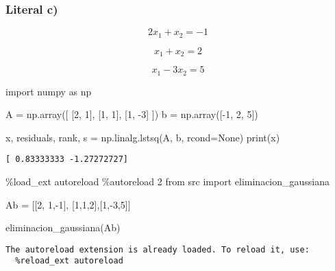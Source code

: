 \documentclass[
  letterpaper,
  DIV=11,
  numbers=noendperiod]{scrartcl}
\newenvironment{Shaded}{\begin{snugshade}}{\end{snugshade}}
\newcommand{\BuiltInTok}[1]{\textcolor[rgb]{0.00,0.23,0.31}{#1}}
\newcommand{\DecValTok}[1]{\textcolor[rgb]{0.68,0.00,0.00}{#1}}
\newcommand{\ImportTok}[1]{\textcolor[rgb]{0.00,0.46,0.62}{#1}}
\newcommand{\NormalTok}[1]{\textcolor[rgb]{0.00,0.23,0.31}{#1}}
\newcommand{\OperatorTok}[1]{\textcolor[rgb]{0.37,0.37,0.37}{#1}}
\newcommand{\VariableTok}[1]{\textcolor[rgb]{0.07,0.07,0.07}{#1}}
\begin{document}
\subsubsection{Literal c)}\label{literal-c}

\[2x_1 + x_2 = -1\]

\[x_1 + x_2 = 2\]

\[x_1 - 3x_2 = 5\]

\begin{Shaded}
\begin{Highlighting}[]

\ImportTok{import}\NormalTok{ numpy }\ImportTok{as}\NormalTok{ np}

\NormalTok{A }\OperatorTok{=}\NormalTok{ np.array([}
\NormalTok{    [}\DecValTok{2}\NormalTok{, }\DecValTok{1}\NormalTok{],}
\NormalTok{    [}\DecValTok{1}\NormalTok{, }\DecValTok{1}\NormalTok{],}
\NormalTok{    [}\DecValTok{1}\NormalTok{, }\OperatorTok{{-}}\DecValTok{3}\NormalTok{]}
\NormalTok{])}
\NormalTok{b }\OperatorTok{=}\NormalTok{ np.array([}\OperatorTok{{-}}\DecValTok{1}\NormalTok{, }\DecValTok{2}\NormalTok{, }\DecValTok{5}\NormalTok{])}

\NormalTok{x, residuals, rank, s }\OperatorTok{=}\NormalTok{ np.linalg.lstsq(A, b, rcond}\OperatorTok{=}\VariableTok{None}\NormalTok{)}
\BuiltInTok{print}\NormalTok{(x)}
\end{Highlighting}
\end{Shaded}

\begin{verbatim}
[ 0.83333333 -1.27272727]
\end{verbatim}

\begin{Shaded}
\begin{Highlighting}[]
\OperatorTok{\%}\NormalTok{load\_ext autoreload}
\OperatorTok{\%}\NormalTok{autoreload }\DecValTok{2}
\ImportTok{from}\NormalTok{ src }\ImportTok{import}\NormalTok{ eliminacion\_gaussiana}

\NormalTok{Ab }\OperatorTok{=}\NormalTok{ [[}\DecValTok{2}\NormalTok{, }\DecValTok{1}\NormalTok{,}\OperatorTok{{-}}\DecValTok{1}\NormalTok{], [}\DecValTok{1}\NormalTok{,}\DecValTok{1}\NormalTok{,}\DecValTok{2}\NormalTok{],[}\DecValTok{1}\NormalTok{,}\OperatorTok{{-}}\DecValTok{3}\NormalTok{,}\DecValTok{5}\NormalTok{]]}

\NormalTok{eliminacion\_gaussiana(Ab)}
\end{Highlighting}
\end{Shaded}

\begin{verbatim}
The autoreload extension is already loaded. To reload it, use:
  %reload_ext autoreload
\end{verbatim}
\end{document}
